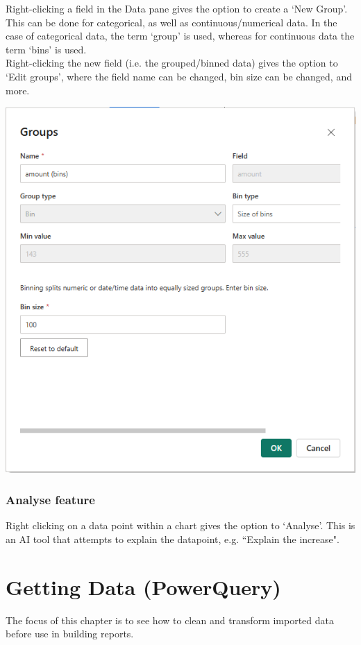 \documentclass[10pt, openany, twocolumn]{book}
\begin{document}
Right-clicking a field in the Data pane gives the option to create a `New Group'. \\

This can be done for categorical, as well as continuous/numerical data. In the case of categorical data, the term `group' is used, whereas for continuous data the term `bins' is used.\\

Right-clicking the new field (i.e. the grouped/binned data) gives the option to `Edit groups', where the field name can be changed, bin size can be changed, and more.

\begin{center}
    \includegraphics[width = 0.67\columnwidth]{images/groups.png}
\end{center}

\subsection*{Analyse feature}

Right clicking on a data point within a chart gives the option to `Analyse'. This is an AI tool that attempts to explain the datapoint, e.g. ``Explain the increase". 


\chapter{Getting Data (PowerQuery)}

The focus of this chapter is to see how to clean and transform imported data before use in building reports. \\
\end{document}
